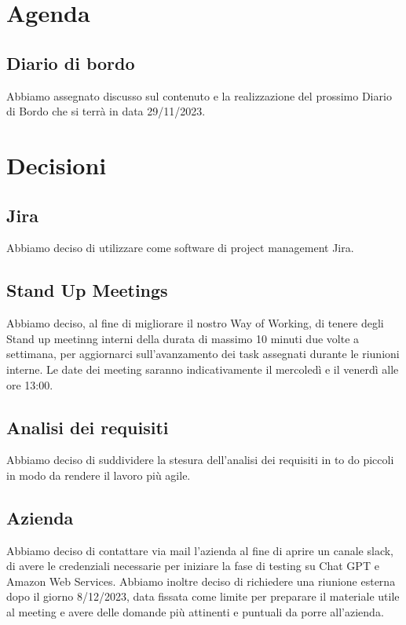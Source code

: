 \documentclass{article}
\begin{document}
\section{Agenda}
\label{sec:decisioni}
\subsection{Diario di bordo}
Abbiamo assegnato discusso sul contenuto e la realizzazione del prossimo Diario di Bordo che si terrà in data 29/11/2023.

\section{Decisioni}
\subsection{Jira}
Abbiamo deciso di utilizzare come software di project management Jira.

\subsection{Stand Up Meetings}
Abbiamo deciso, al fine di migliorare il nostro Way of Working, di tenere degli Stand up meetinng interni della durata di massimo 10 minuti due volte a settimana, per aggiornarci sull'avanzamento dei task assegnati durante le riunioni interne. Le date dei meeting saranno indicativamente il mercoledì e il venerdì alle ore 13:00.

\subsection{Analisi dei requisiti}
Abbiamo deciso di suddividere la stesura dell'analisi dei requisiti in to do piccoli in modo da rendere il lavoro più agile.

\subsection{Azienda}
Abbiamo deciso di contattare via mail l'azienda al fine di aprire un canale slack, di avere le credenziali necessarie per iniziare la fase di testing su Chat GPT e Amazon Web Services. Abbiamo inoltre deciso di richiedere una riunione esterna dopo il giorno 8/12/2023, data fissata come limite per preparare il materiale utile al meeting e avere delle domande più attinenti e puntuali da porre all'azienda.
\end{document}
